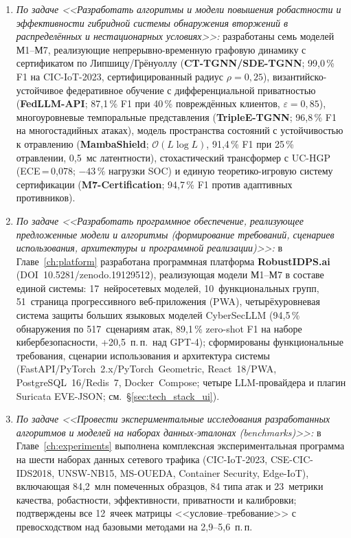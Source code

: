 \begin{enumerate}[leftmargin=2em, itemsep=0pt]
\item \textit{По задаче <<Разработать алгоритмы и модели
повышения робастности и эффективности гибридной системы
обнаружения вторжений в распределённых и нестационарных
условиях>>:} разработаны семь моделей М1--М7, реализующие
непрерывно-временную графовую динамику с сертификатом по
Липшицу/Грёнуоллу (\textbf{CT-TGNN/SDE-TGNN}; 99{,}0\,\% F1
на CIC-IoT-2023, сертифицированный радиус $\rho=0{,}25$),
византийско-устойчивое федеративное обучение с дифференциальной
приватностью (\textbf{FedLLM-API}; 87{,}1\,\% F1 при 40\,\%
повреждённых клиентов, $\varepsilon=0{,}85$), многоуровневые
темпоральные представления (\textbf{TripleE-TGNN}; 96{,}8\,\% F1
на многостадийных атаках), модель пространства состояний с
устойчивостью к отравлению (\textbf{MambaShield};
$\mathcal{O}(L\log L)$, 91{,}4\,\% F1 при 25\,\% отравлении,
0{,}5~мс латентности), стохастический трансформер с UC-HGP
(ECE\,=\,0{,}078; $-43\,\%$ нагрузки SOC) и единую
теоретико-игровую систему сертификации
(\textbf{M7-Certification}; 94{,}7\,\% F1 против адаптивных
противников).

\item \textit{По задаче <<Разработать программное обеспечение,
реализующее предложенные модели и алгоритмы (формирование
требований, сценариев использования, архитектуры и программной
реализации)>>:} в Главе~\ref{ch:platform} разработана
программная платформа \textbf{RobustIDPS.ai}
(DOI~10.5281/zenodo.19129512), реализующая модели М1--М7 в
составе единой системы: 17~нейросетевых моделей,
10~функциональных групп, 51~страница прогрессивного
веб-приложения (PWA), четырёхуровневая система защиты больших
языковых моделей CyberSecLLM (94{,}5\,\% обнаружения по
517~сценариям атак, 89{,}1\,\% zero-shot F1 на наборе
кибербезопасности, +20{,}5~п.\,п.\ над GPT-4); сформированы
функциональные требования, сценарии использования и архитектура
системы (FastAPI/PyTorch~2.x/PyTorch~Geometric, React~18/PWA,
PostgreSQL~16/Redis~7, Docker~Compose; четыре LLM-провайдера и
плагин Suricata EVE-JSON; см.~\S\ref{sec:tech_stack_ui}).

\item \textit{По задаче <<Провести экспериментальные исследования
разработанных алгоритмов и моделей на наборах данных-эталонах
(benchmarks)>>:} в Главе~\ref{ch:experiments} выполнена
комплексная экспериментальная программа на шести наборах данных
сетевого трафика (CIC-IoT-2023, CSE-CIC-IDS2018, UNSW-NB15,
MS-OUEDA, Container Security, Edge-IoT), включающая 84{,}2~млн
помеченных образцов, 84 типа атак и 23~метрики качества,
робастности, эффективности, приватности и калибровки;
подтверждены все 12~ячеек матрицы <<условие--требование>> с
превосходством над базовыми методами на 2{,}9--5{,}6~п.\,п.


\end{enumerate}
